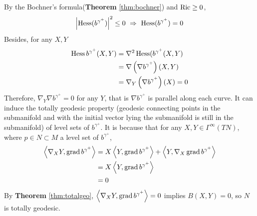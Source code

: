 \begin{enumerate}[label=\arabic{*}.]
	By the Bochner's formula(\textbf{Theorem} \ref{thm:bochner}) and $\operatorname{Ric} \geq 0$,
	\begin{equation*}
		\left\lvert\operatorname{Hess}(b^{\gamma^+})\right\lvert^2 \leq 0~\Rightarrow~\operatorname{Hess}(b^{\gamma^+}) = 0
	\end{equation*}
	Besides, for any $X,Y$
	\begin{equation*}
		\begin{aligned}
			\operatorname{Hess}b^{\gamma^+}(X,Y) &= \nabla^2\operatorname{Hess}(b^{\gamma^+}(X,Y) \\
			&= \nabla \left(\nabla b^{\gamma^+}\right)(X,Y)\\
			&= \nabla_Y \left(\nabla b^{\gamma^+}\right)(X) = 0
		\end{aligned}
	\end{equation*}
	Therefore, $\nabla_Y\nabla b^{\gamma^+} = 0$ for any $Y$, that is $\nabla b^{\gamma^+}$ is parallel along each curve. It can induce the totally geodesic property (geodesic connecting points in the submanifold and with the initial vector lying the submanifold is still in the submanifold) of level sets of $b^{\gamma^+}$. It is because that for any $X,Y \in \Gamma^\infty(TN)$, where $p \in N \subset M$ a level set of $b^{\gamma^+}$,
	\begin{equation*}
		\begin{aligned}
			\left\langle \nabla_XY,\operatorname{grad}b^{\gamma^+} \right\rangle &= X\left\langle Y,\operatorname{grad}b^{\gamma^+} \right\rangle +\left\langle Y,\nabla_X\operatorname{grad}b^{\gamma^+} \right\rangle \\
			&= X\left\langle Y,\operatorname{grad}b^{\gamma^+} \right\rangle \\
			&=0
		\end{aligned}
	\end{equation*}
	By \textbf{Theorem} \ref{thm:totalgeo}, $\left\langle \nabla_XY,\operatorname{grad}b^{\gamma^+} \right\rangle = 0$ implies $B(X,Y) = 0$, so $N$ is totally geodesic.


\end{enumerate}
